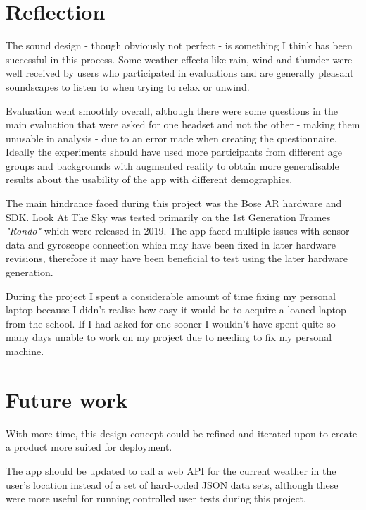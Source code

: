 \documentclass{l4proj}
\begin{document}
\section{Reflection}
The sound design - though obviously not perfect - is something I think has been successful in this process. Some weather effects like rain, wind and thunder were well received by users who participated in evaluations and are generally pleasant soundscapes to listen to when trying to relax or unwind.

Evaluation went smoothly overall, although there were some questions in the main evaluation that were asked for one headset and not the other - making them unusable in analysis - due to an error made when creating the questionnaire. Ideally the experiments should have used more participants from different age groups and backgrounds with augmented reality to obtain more generalisable results about the usability of the app with different demographics.

The main hindrance faced during this project was the Bose AR hardware and SDK. Look At The Sky was tested primarily on the 1st Generation Frames \emph{"Rondo"} which were released in 2019. The app faced multiple issues with sensor data and gyroscope connection which may have been fixed in later hardware revisions, therefore it may have been beneficial to test using the later hardware generation.

During the project I spent a considerable amount of time fixing my personal laptop because I didn't realise how easy it would be to acquire a loaned laptop from the school. If I had asked for one sooner I wouldn't have spent quite so many days unable to work on my project due to needing to fix my personal machine.

\section{Future work}
With more time, this design concept could be refined and iterated upon to create a product more suited for deployment.

The app should be updated to call a web API for the current weather in the user's location instead of a set of hard-coded JSON data sets, although these were more useful for running controlled user tests during this project.
\end{document}
